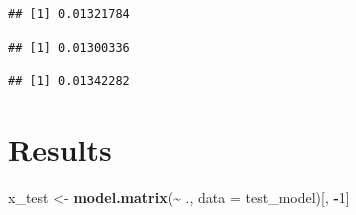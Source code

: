 \documentclass[
  11pt,
]{article}
\newenvironment{Shaded}{\begin{snugshade}}{\end{snugshade}}
\newcommand{\AttributeTok}[1]{\textcolor[rgb]{0.13,0.29,0.53}{#1}}
\newcommand{\DecValTok}[1]{\textcolor[rgb]{0.00,0.00,0.81}{#1}}
\newcommand{\FunctionTok}[1]{\textcolor[rgb]{0.13,0.29,0.53}{\textbf{#1}}}
\newcommand{\NormalTok}[1]{#1}
\newcommand{\OtherTok}[1]{\textcolor[rgb]{0.56,0.35,0.01}{#1}}
\newcommand{\SpecialCharTok}[1]{\textcolor[rgb]{0.81,0.36,0.00}{\textbf{#1}}}
\begin{document}
\begin{verbatim}
## [1] 0.01321784
\end{verbatim}

\begin{Shaded}
\end{Shaded}

\begin{verbatim}
## [1] 0.01300336
\end{verbatim}

\begin{Shaded}
\end{Shaded}

\begin{verbatim}
## [1] 0.01342282
\end{verbatim}

\section{Results}\label{results}

\begin{Shaded}
\begin{Highlighting}[]
\NormalTok{x\_test }\OtherTok{\textless{}{-}} \FunctionTok{model.matrix}\NormalTok{(}\SpecialCharTok{\textasciitilde{}}\NormalTok{ ., }\AttributeTok{data =}\NormalTok{ test\_model)[, }\SpecialCharTok{{-}}\DecValTok{1}\NormalTok{]}
\end{Highlighting}
\end{Shaded}
\end{document}
